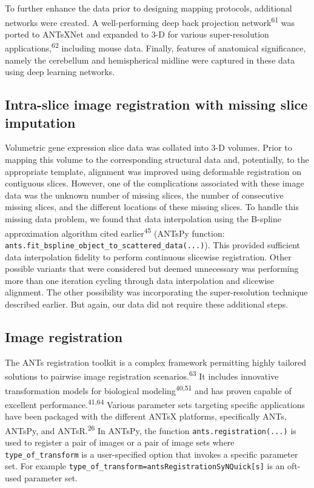 \documentclass[
  12pt,
]{article}
\begin{document}
To further enhance the data prior to designing mapping protocols,
additional networks were created. A well-performing deep back projection
network\textsuperscript{61} was ported to ANTsXNet and expanded to 3-D
for various super-resolution applications,\textsuperscript{62} including
mouse data. Finally, features of anatomical significance, namely the
cerebellum and hemispherical midline were captured in these data using
deep learning networks.

\hypertarget{intra-slice-image-registration-with-missing-slice-imputation}{%
\subsection*{Intra-slice image registration with missing slice
imputation}\label{intra-slice-image-registration-with-missing-slice-imputation}}

Volumetric gene expression slice data was collated into 3-D volumes.
Prior to mapping this volume to the corresponding structural data and,
potentially, to the appropriate template, alignment was improved using
deformable registration on contiguous slices. However, one of the
complications associated with these image data was the unknown number of
missing slices, the number of consecutive missing slices, and the
different locations of these missing slices. To handle this missing data
problem, we found that data interpolation using the B-spline
approximation algorithm cited earlier\textsuperscript{45} (ANTsPy
function: \texttt{ants.fit\_bspline\_object\_to\_scattered\_data(...)}).
This provided sufficient data interpolation fidelity to perform
continuous slicewise registration. Other possible variants that were
considered but deemed unnecessary was performing more than one iteration
cycling through data interpolation and slicewise alignment. The other
possibility was incorporating the super-resolution technique described
earlier. But again, our data did not require these additional steps.

\hypertarget{image-registration}{%
\subsection*{Image registration}\label{image-registration}}

The ANTs registration toolkit is a complex framework permitting highly
tailored solutions to pairwise image registration
scenarios.\textsuperscript{63} It includes innovative transformation
models for biological modeling\textsuperscript{40,51} and has proven
capable of excellent performance.\textsuperscript{41,64} Various
parameter sets targeting specific applications have been packaged with
the different ANTsX platforms, specifically ANTs, ANTsPy, and
ANTsR.\textsuperscript{26} In ANTsPy, the function
\texttt{ants.registration(...)} is used to register a pair of images or
a pair of image sets where \texttt{type\_of\_transform} is a
user-specified option that invokes a specific parameter set. For example
\texttt{type\_of\_transform=\textquotesingle{}antsRegistrationSyNQuick{[}s{]}\textquotesingle{}}
is an oft-used parameter set.
\end{document}
